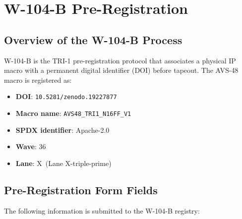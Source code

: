 \section{W-104-B Pre-Registration}
\label{sec:w104b}

\subsection{Overview of the W-104-B Process}

W-104-B is the TRI-1 pre-registration protocol that associates a
physical IP macro with a permanent digital identifier (DOI) before
tapeout.  The AVS-48 macro is registered as:
\begin{itemize}
  \item \textbf{DOI}: \texttt{10.5281/zenodo.19227877}
  \item \textbf{Macro name}: \texttt{AVS48\_TRI1\_N16FF\_V1}
  \item \textbf{SPDX identifier}: Apache-2.0
  \item \textbf{Wave}: 36
  \item \textbf{Lane}: X\textquotesingle\textquotesingle\textquotesingle\ (Lane X-triple-prime)
\end{itemize}

\subsection{Pre-Registration Form Fields}

The following information is submitted to the W-104-B registry:

